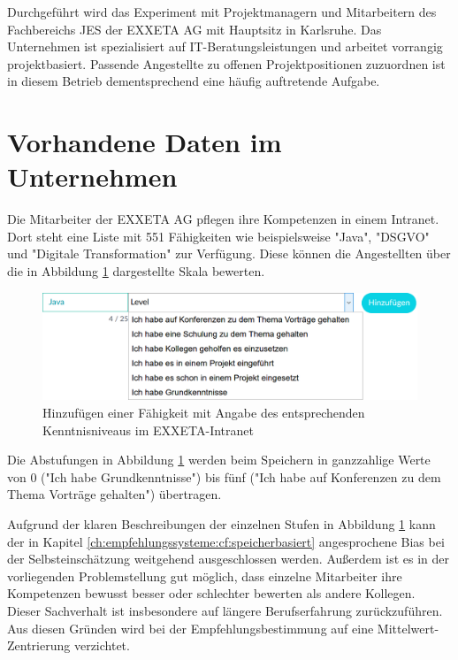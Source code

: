Durchgeführt wird das Experiment mit Projektmanagern und Mitarbeitern des Fachbereichs \ac{JES} der EXXETA AG mit Hauptsitz in Karlsruhe. Das Unternehmen ist spezialisiert auf IT-Beratungsleistungen und arbeitet vorrangig projektbasiert. Passende Angestellte zu offenen Projektpositionen zuzuordnen ist in diesem Betrieb dementsprechend eine häufig auftretende Aufgabe.

\section{Vorhandene Daten im Unternehmen}
\label{ch:methodik:versuchsaufbau}
Die Mitarbeiter der EXXETA AG pflegen ihre Kompetenzen in einem Intranet. Dort steht eine Liste mit 551 Fähigkeiten wie beispielsweise "Java", "DSGVO" und "Digitale Transformation" zur Verfügung. Diese können die Angestellten über die in Abbildung \ref{fig:methodik:versuchsaufbau:daten:abb1} dargestellte Skala bewerten.

\begin{figure}[h]
	\centering
	\includegraphics[width=1\textwidth]{gfx/skill-level.png}
	\caption{Hinzufügen einer Fähigkeit mit Angabe des entsprechenden Kenntnisniveaus im EXXETA-Intranet}
	\label{fig:methodik:versuchsaufbau:daten:abb1}
\end{figure}

Die Abstufungen in Abbildung \ref{fig:methodik:versuchsaufbau:daten:abb1} werden beim Speichern in ganzzahlige Werte von 0 ("Ich habe Grundkenntnisse") bis fünf ("Ich habe auf Konferenzen zu dem Thema Vorträge gehalten") übertragen.

Aufgrund der klaren Beschreibungen der einzelnen Stufen in Abbildung \ref{fig:methodik:versuchsaufbau:daten:abb1} kann der in Kapitel \ref{ch:empfehlungssysteme:cf:speicherbasiert} angesprochene Bias bei der Selbsteinschätzung weitgehend ausgeschlossen werden. Außerdem ist es in der vorliegenden Problemstellung gut möglich, dass einzelne Mitarbeiter ihre Kompetenzen bewusst besser oder schlechter bewerten als andere Kollegen. Dieser Sachverhalt ist insbesondere auf längere Berufserfahrung zurückzuführen. Aus diesen Gründen wird bei der Empfehlungsbestimmung auf eine Mittelwert-Zentrierung verzichtet.

